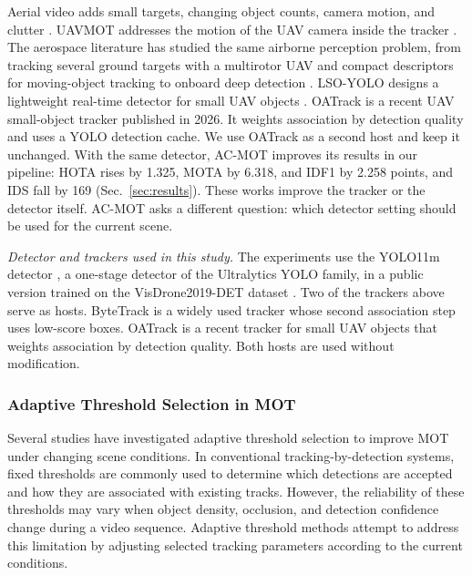 \documentclass[journal]{new-aiaa}
\begin{document}
Aerial video adds small targets, changing object counts, camera motion, and
clutter \cite{zhu2022visdrone,du2018uavdt}. UAVMOT addresses the motion of the
UAV camera inside the tracker \cite{liu2022uavmot}. The aerospace literature has
studied the same airborne perception problem, from tracking several ground
targets with a multirotor UAV \cite{miller2015multitarget} and compact
descriptors for moving-object tracking \cite{desai2017uavfeature} to onboard
deep detection \cite{lu2024uavdetection,choi2022docking}. LSO-YOLO designs a
lightweight real-time detector for small UAV objects \cite{dai2026lsoyolo}.
OATrack \cite{qi2026oatrack} is a recent UAV small-object tracker published in
2026. It weights association by detection quality and uses a YOLO detection
cache. We use OATrack as a second host and keep it unchanged. With the same
detector, AC-MOT improves its results in our pipeline: HOTA rises by 1.325,
MOTA by 6.318, and IDF1 by 2.258 points, and IDS fall by 169
(Sec.~\ref{sec:results}). These works improve the tracker or the detector
itself. AC-MOT asks a different question: which detector setting should be
used for the current scene.

\emph{Detector and trackers used in this study.} The experiments use the YOLO11m detector \cite{jocher2024yolo11}, a
one-stage detector of the Ultralytics YOLO family, in a public version trained
on the VisDrone2019-DET dataset \cite{zhu2022visdrone}. Two of the trackers
above serve as hosts. ByteTrack \cite{zhang2022bytetrack} is a widely used
tracker whose second association step uses low-score boxes. OATrack
\cite{qi2026oatrack} is a recent tracker for small UAV objects that weights
association by detection quality. Both hosts are used without modification.

\subsubsection{Adaptive Threshold Selection in MOT}
Several studies have investigated adaptive threshold selection to improve MOT under changing scene conditions. In conventional tracking-by-detection systems, fixed thresholds are commonly used to determine which detections are accepted and how they are associated with existing tracks. However, the reliability of these thresholds may vary when object density, occlusion, and detection confidence change during a video sequence. Adaptive threshold methods attempt to address this limitation by adjusting selected tracking parameters according to the current conditions.
\end{document}
